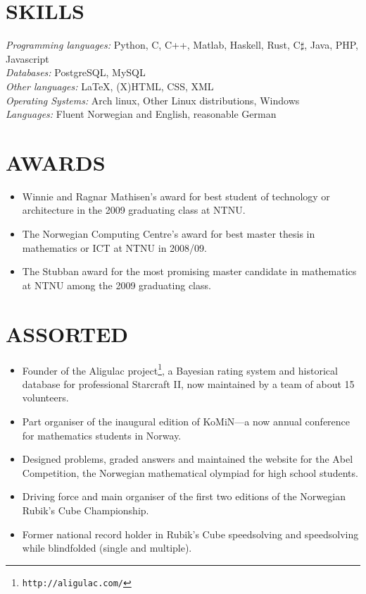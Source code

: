\documentclass[line,margin]{res}
\begin{document}
\begin{resume}
\section{SKILLS}

{\em Programming languages:} Python, C, C++, Matlab, Haskell, Rust, C$\sharp$,
Java, PHP, Javascript \\
{\em Databases:} PostgreSQL, MySQL \\
{\em Other languages:} \LaTeX, (X)HTML, CSS, XML \\
{\em Operating Systems:} Arch linux, Other Linux distributions, Windows \\
{\em Languages:} Fluent Norwegian and English, reasonable German


\section{AWARDS}

\begin{itemize}
\item Winnie and Ragnar Mathisen's award for best student of technology
  or architecture in the 2009 graduating class at NTNU.
\item The Norwegian Computing Centre's award for best master thesis in
  mathematics or ICT at NTNU in 2008/09.
\item The Stubban award for the most promising master candidate in
  mathematics at NTNU among the 2009 graduating class.
\end{itemize}


\newpage

\section{ASSORTED}

\begin{itemize}
\item Founder of the Aligulac project\footnote{{\tt http://aligulac.com/}}, a
  Bayesian rating system and historical database for professional Starcraft II,
  now maintained by a team of about 15 volunteers.
\item Part organiser of the inaugural edition of KoMiN---a now annual conference
  for mathematics students in Norway.
\item Designed problems, graded answers and maintained the website for the Abel
  Competition, the Norwegian mathematical olympiad for high school students.
\item Driving force and main organiser of the first two editions of the
  Norwegian Rubik's Cube Championship.
\item Former national record holder in Rubik's Cube speedsolving and
  speedsolving while blindfolded (single and multiple).
\end{itemize}



\end{resume}
\end{document}
